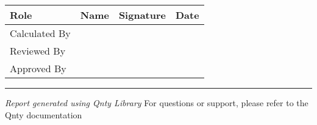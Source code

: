 \documentclass[11pt,a4paper]{article}
\begin{document}
\vspace{1em}

\begin{longtable}{|p{3cm}|p{4cm}|p{4cm}|p{2.5cm}|}
\hline
\textbf{Role} & \textbf{Name} & \textbf{Signature} & \textbf{Date} \\
\hline
\hline
Calculated By & \rule{0pt}{1.5cm} & & \\
\hline
Reviewed By & \rule{0pt}{1.5cm} & & \\
\hline
Approved By & \rule{0pt}{1.5cm} & & \\
\hline
\end{longtable}

\vspace{1em}

\begin{center}
\rule{\textwidth}{0.4pt}
\vspace{0.5em}
\textit{Report generated using Qnty Library}
\vspace{0.5em}
{\footnotesize For questions or support, please refer to the Qnty documentation}
\end{center}
\end{document}
